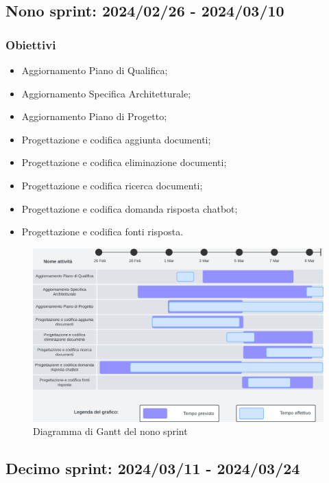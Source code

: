 \subsection{Nono sprint: 2024/02/26 - 2024/03/10}
\subsubsection{Obiettivi}
\begin{itemize}[itemsep=-2pt]
    \item Aggiornamento Piano di Qualifica;
    \item Aggiornamento Specifica Architetturale;
    \item Aggiornamento Piano di Progetto;
    \item Progettazione e codifica aggiunta documenti;
    \item Progettazione e codifica eliminazione documenti;
    \item Progettazione e codifica ricerca documenti;
    \item Progettazione e codifica domanda risposta chatbot;
    \item Progettazione e codifica fonti risposta.
\end{itemize}

\begin{figure}[h!]
    \centering
    \includegraphics[width=\textwidth]{Roadmap9sprint.png}
    \caption{Diagramma di Gantt del nono sprint}
    \label{fig:roadmaps9s} 
\end{figure}

\newpage

\subsection{Decimo sprint: 2024/03/11 - 2024/03/24}

